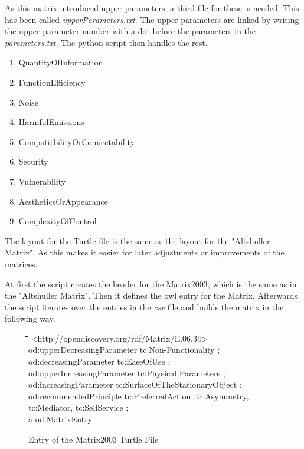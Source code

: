 \documentclass[11pt,a4paper]{article}
\newenvironment{code}{\tt \begin{tabbing}
\hskip12pt\=\hskip12pt\=\hskip12pt\=\hskip12pt\=\hskip5cm\=\hskip5cm\=\kill}
{\end{tabbing}}
\begin{document}
As this matrix introduced upper-parameters, a third file for these is needed.
This has been called \textit{upperParameters.txt}.  The upper-parameters are
linked by writing the upper-parameter number with a dot before the parameters
in the \textit{parameters.txt}.  The python script then handles the rest.

\begin{enumerate}
\item QuantityOfInformation
\item FunctionEfficiency
\item Noise
\item HarmfulEmissions
\item CompatitbilityOrConnectability
\item Security
\item Vulnerability
\item AestheticsOrAppearance
\item ComplexityOfControl
\end{enumerate}

The layout for the Turtle file is the same as the layout for the "Altshuller
Matrix".  As this makes it easier for later adjustments or improvements of the
matrices.

At first the script creates the header for the Matrix2003, which is the same
as in the "Altshuller Matrix".  Then it defines the owl entry for the Matrix.
Afterwards the script iterates over the entries in the \textit{csv} file and
builds the matrix in the following way.

\begin{figure}[ht]
  \centering
  \begin{code}
    <http://opendiscovery.org/rdf/Matrix/E.06.34>\\
    \> od:upperDecreasingParameter tc:Non-Functionality ;\\
    \> od:decreasingParameter tc:EaseOfUse ;\\
    \> od:upperIncreasingParameter tc:Physical Parameters ;\\
    \> od:increasingParameter tc:SurfaceOfTheStationaryObject ;\\
    \> od:recommendedPrinciple tc:PreferredAction, tc:Asymmetry, \\
    \> \> \> tc:Mediator, tc:SelfService ;\\
    \> a od:MatrixEntry .
  \end{code}
  \caption{Entry of the Matrix2003 Turtle File}
\end{figure}
\end{document}
